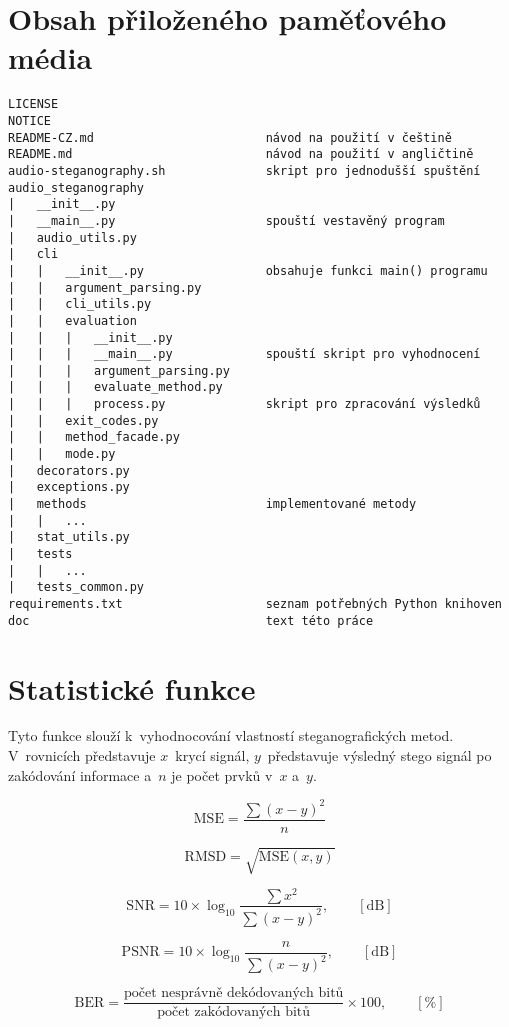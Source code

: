 \chapter{Obsah přiloženého paměťového média}
\label{cha:medium-contents}

\begin{verbatim}
LICENSE
NOTICE
README-CZ.md                        návod na použití v češtině
README.md                           návod na použití v angličtině
audio-steganography.sh              skript pro jednodušší spuštění
audio_steganography
|   __init__.py
|   __main__.py                     spouští vestavěný program
|   audio_utils.py
|   cli
|   |   __init__.py                 obsahuje funkci main() programu
|   |   argument_parsing.py
|   |   cli_utils.py
|   |   evaluation
|   |   |   __init__.py
|   |   |   __main__.py             spouští skript pro vyhodnocení
|   |   |   argument_parsing.py
|   |   |   evaluate_method.py
|   |   |   process.py              skript pro zpracování výsledků
|   |   exit_codes.py
|   |   method_facade.py
|   |   mode.py
|   decorators.py
|   exceptions.py
|   methods                         implementované metody
|   |   ...
|   stat_utils.py
|   tests
|   |   ...
|   tests_common.py
requirements.txt                    seznam potřebných Python knihoven
doc                                 text této práce
\end{verbatim}


\chapter{Statistické funkce}
\label{cha:statistical-functions}

Tyto funkce slouží k~vyhodnocování vlastností steganografických metod.
V~rovnicích představuje $x$~krycí signál, $y$~představuje výsledný stego
signál po zakódování informace a~$n$ je počet prvků v~$x$ a~$y$.

\begin{equation}
    \textrm{MSE} = \frac{\sum{(x-y)^2}}{n}
\end{equation}

\begin{equation}
    \textrm{RMSD} = \sqrt{\textrm{MSE}(x, y)}
\end{equation}

\begin{equation}
    \textrm{SNR} = 10 \times \log_{10}{\frac{\sum{x^2}}{\sum{(x-y)^2}}}, \qquad [\textrm{dB}]
\end{equation}

\begin{equation}
    \textrm{PSNR} = 10 \times \log_{10}{\frac{n}{\sum{(x-y)^2}}}, \qquad [\textrm{dB}]
\end{equation}

\begin{equation}
    \textrm{BER} = \frac{\textrm{počet nesprávně dekódovaných bitů}}{\textrm{počet zakódovaných bitů}} \times 100, \qquad [\%]
\end{equation}
